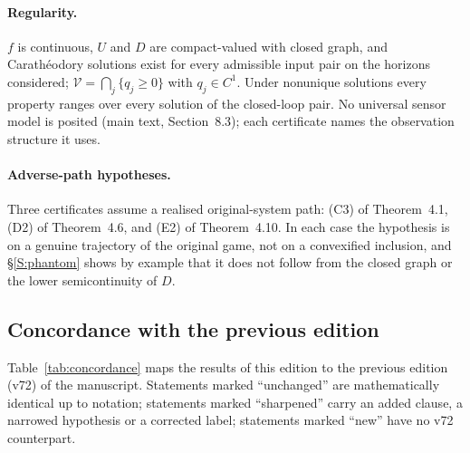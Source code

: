 \documentclass[11pt,a4paper]{article}
\theoremstyle{plain}
\theoremstyle{definition}
\theoremstyle{remark}
\newcommand{\cV}{\mathcal{V}}
\newcommand{\hyp}[1]{\textup{(#1)}}
\begin{document}
\paragraph{Regularity.} $f$ is continuous, $U$ and $D$ are compact-valued with closed graph, and Carath\'eodory solutions exist for every admissible input pair on the horizons considered; $\cV=\bigcap_j\{q_j\ge0\}$ with $q_j\in C^1$. Under nonunique solutions every property ranges over every solution of the closed-loop pair. No universal sensor model is posited (main text, Section~8.3); each certificate names the observation structure it uses.

\paragraph{Adverse-path hypotheses.} Three certificates assume a realised original-system path: \hyp{C3} of Theorem~4.1, \hyp{D2} of Theorem~4.6, and \hyp{E2} of Theorem~4.10. In each case the hypothesis is on a genuine trajectory of the original game, not on a convexified inclusion, and \S\ref{S:phantom} shows by example that it does not follow from the closed graph or the lower semicontinuity of $D$.

\subsection{Concordance with the previous edition}
Table~\ref{tab:concordance} maps the results of this edition to the previous edition (v72) of the manuscript. Statements marked ``unchanged'' are mathematically identical up to notation; statements marked ``sharpened'' carry an added clause, a narrowed hypothesis or a corrected label; statements marked ``new'' have no v72 counterpart.
\end{document}
